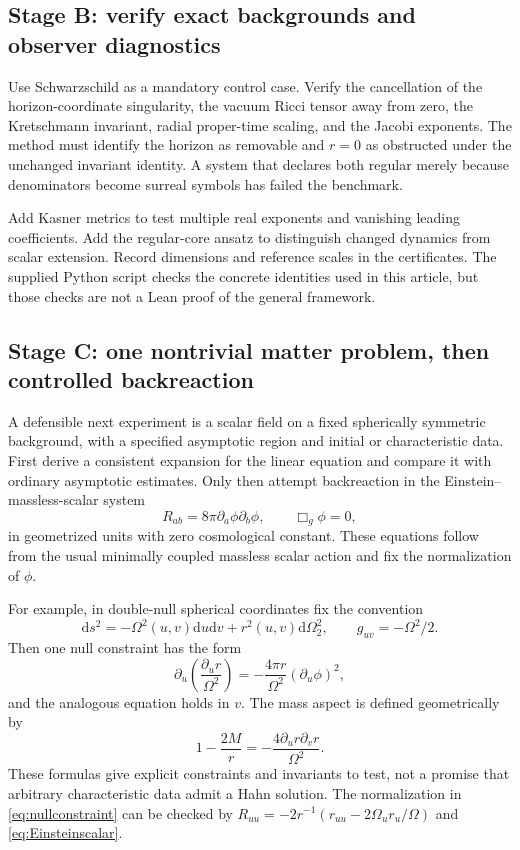 \documentclass[11pt,a4paper]{article}
\numberwithin{equation}{section}
\theoremstyle{definition}
\theoremstyle{remark}
\newcommand{\dd}{\mathrm d}
\begin{document}
\subsection{Stage B: verify exact backgrounds and observer diagnostics}
Use Schwarzschild as a mandatory control case. Verify the cancellation of the horizon-coordinate singularity, the vacuum Ricci tensor away from zero, the Kretschmann invariant, radial proper-time scaling, and the Jacobi exponents. The method must identify the horizon as removable and $r=0$ as obstructed under the unchanged invariant identity. A system that declares both regular merely because denominators become surreal symbols has failed the benchmark.

Add Kasner metrics to test multiple real exponents and vanishing leading coefficients. Add the regular-core ansatz to distinguish changed dynamics from scalar extension. Record dimensions and reference scales in the certificates. The supplied Python script checks the concrete identities used in this article, but those checks are not a Lean proof of the general framework.

\subsection{Stage C: one nontrivial matter problem, then controlled backreaction}
A defensible next experiment is a scalar field on a fixed spherically symmetric background, with a specified asymptotic region and initial or characteristic data. First derive a consistent expansion for the linear equation and compare it with ordinary asymptotic estimates. Only then attempt backreaction in the Einstein--massless-scalar system
\begin{equation}\label{eq:Einsteinscalar}
 R_{ab}=8\pi\partial_a\phi\partial_b\phi,
 \qquad \Box_g\phi=0,
\end{equation}
in geometrized units with zero cosmological constant. These equations follow from the usual minimally coupled massless scalar action and fix the normalization of $\phi$.

For example, in double-null spherical coordinates fix the convention
\begin{equation}
 \dd s^2=-\Omega^2(u,v)\dd u\dd v+r^2(u,v)\dd\Omega_2^2,
 \qquad g_{uv}=-\Omega^2/2.
\end{equation}
Then one null constraint has the form
\begin{equation}\label{eq:nullconstraint}
 \partial_u\left(\frac{\partial_u r}{\Omega^2}\right)
 =-\frac{4\pi r}{\Omega^2}(\partial_u\phi)^2,
\end{equation}
and the analogous equation holds in $v$. The mass aspect is defined geometrically by
\begin{equation}\label{eq:massaspect}
 1-\frac{2M}{r}=-\frac{4\partial_u r\partial_v r}{\Omega^2}.
\end{equation}
These formulas give explicit constraints and invariants to test, not a promise that arbitrary characteristic data admit a Hahn solution. The normalization in \eqref{eq:nullconstraint} can be checked by $R_{uu}=-2r^{-1}(r_{uu}-2\Omega_u r_u/\Omega)$ and \eqref{eq:Einsteinscalar}.
\end{document}
